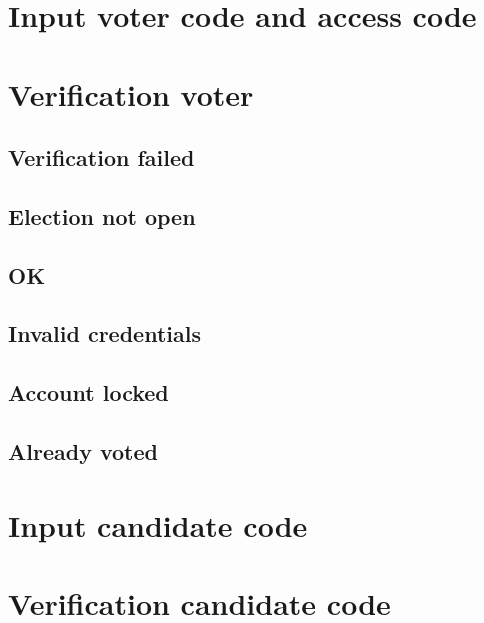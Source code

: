 \section{Input voter code and access code}\label{sec9:input-voter-code}

\section{Verification voter}\label{sec9:verification-voter}

\subsection{Verification failed}\label{sec9:verification-failed}

\subsection{Election not open}\label{sec9:election-not-open}

\subsection{OK}\label{sec9:ok}

\subsection{Invalid credentials}\label{sec9:invalid-credentials}

\subsection{Account locked}\label{sec9:account-locked}

\subsection{Already voted}\label{sec9:already-voted}

\section{Input candidate code}\label{sec9:input-candidate-code}

\section{Verification candidate code}\label{sec9:verif-cand-code}

